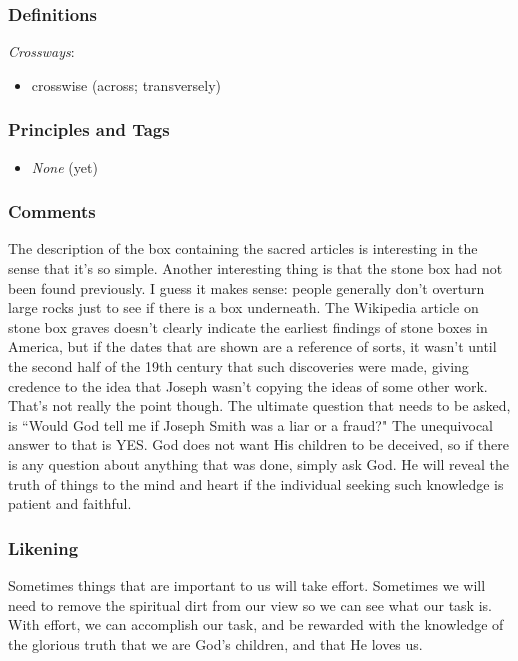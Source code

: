 \documentclass[12pt]{report}
\begin{document}
\subsubsection{Definitions\label{js:DFN19}}
\emph{Crossways}: \begin{itemize}
\item crosswise (across; transversely)
\end{itemize}

\subsubsection{Principles and Tags\label{js:principles19}}
\begin{itemize}
\item \index{}\emph{None} (yet)
\end{itemize}

\subsubsection{Comments\label{js:comments19}}
The description of the box containing the sacred articles is interesting in the sense that it's so simple.  Another interesting thing is that the stone box had not been found previously.  I guess it makes sense: people generally don't overturn large rocks just to see if there is a box underneath.  The Wikipedia article on stone box graves doesn't clearly indicate the earliest findings of stone boxes in America, but if the dates that are shown are a reference of sorts, it wasn't until the second half of the 19th century that such discoveries were made, giving credence to the idea that Joseph wasn't copying the ideas of some other work.  That's not really the point though.  The ultimate question that needs to be asked, is ``Would God tell me if Joseph Smith was a liar or a fraud?"  The unequivocal answer to that is YES.  God does not want His children to be deceived, so if there is any question about anything that was done, simply ask God.  He will reveal the truth of things to the mind and heart if the individual seeking such knowledge is patient and faithful.

\subsubsection{Likening\label{js:likening19}}
Sometimes things that are important to us will take effort.  Sometimes we will need to remove the spiritual dirt from our view so we can see what our task is.  With effort, we can accomplish our task, and be rewarded with the knowledge of the glorious truth that we are God's children, and that He loves us.
\end{document}
